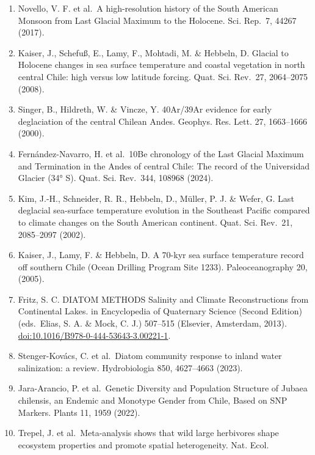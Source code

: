 \documentclass[
]{article}
\begin{document}
\begin{enumerate}
  Lamy, F., Hebbeln, D. \& Wefer, G. High-Resolution Marine Record of
  Climatic Change in Mid-latitude Chile during the Last 28,000 Years
  Based on Terrigenous Sediment Parameters. Quat. Res. 51, 83--93
  (1999).
\item
  Novello, V. F. et al.~A high-resolution history of the South American
  Monsoon from Last Glacial Maximum to the Holocene. Sci. Rep.~7, 44267
  (2017).
\item
  Kaiser, J., Schefu\ss, E., Lamy, F., Mohtadi, M. \& Hebbeln, D.
  Glacial to Holocene changes in sea surface temperature and coastal
  vegetation in north central Chile: high versus low latitude forcing.
  Quat. Sci. Rev.~27, 2064--2075 (2008).
\item
  Singer, B., Hildreth, W. \& Vincze, Y. 40Ar/39Ar evidence for early
  deglaciation of the central Chilean Andes. Geophys. Res. Lett. 27,
  1663--1666 (2000).
\item
  Fernández-Navarro, H. et al.~10Be chronology of the Last Glacial
  Maximum and Termination in the Andes of central Chile: The record of
  the Universidad Glacier (34° S). Quat. Sci. Rev.~344, 108968 (2024).
\item
  Kim, J.-H., Schneider, R. R., Hebbeln, D., Müller, P. J. \& Wefer, G.
  Last deglacial sea-surface temperature evolution in the Southeast
  Pacific compared to climate changes on the South American continent.
  Quat. Sci. Rev.~21, 2085--2097 (2002).
\item
  Kaiser, J., Lamy, F. \& Hebbeln, D. A 70-kyr sea surface temperature
  record off southern Chile (Ocean Drilling Program Site 1233).
  Paleoceanography 20, (2005).
\item
  Fritz, S. C. DIATOM METHODS \textbar{} Salinity and Climate
  Reconstructions from Continental Lakes. in Encyclopedia of Quaternary
  Science (Second Edition) (eds.~Elias, S. A. \& Mock, C. J.) 507--515
  (Elsevier, Amsterdam, 2013).
  \url{doi:10.1016/B978-0-444-53643-3.00221-1}.
\item
  Stenger-Kovács, C. et al.~Diatom community response to inland water
  salinization: a review. Hydrobiologia 850, 4627--4663 (2023).
\item
  Jara-Arancio, P. et al.~Genetic Diversity and Population Structure of
  Jubaea chilensis, an Endemic and Monotype Gender from Chile, Based on
  SNP Markers. Plants 11, 1959 (2022).
\item
  Trepel, J. et al.~Meta-analysis shows that wild large herbivores shape
  ecosystem properties and promote spatial heterogeneity. Nat. Ecol.

\end{enumerate}
\end{document}
